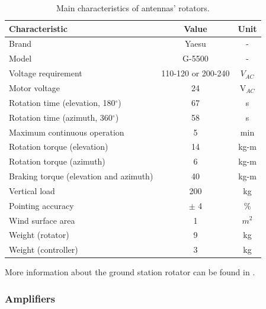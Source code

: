 \begin{table}[!ht]
    \centering
    \begin{tabular}{lcc}
        \toprule[1.5pt]
        \textbf{Characteristic}                     & \textbf{Value}        & \textbf{Unit} \\
        \midrule
        Brand                                       & Yaesu                 & - \\
        Model                                       & G-5500                & - \\
        Voltage requirement                         & 110-120 or 200-240    & $V_{AC}$ \\
        Motor voltage                               & 24                    & V$_{AC}$ \\
        Rotation time (elevation, 180$^{\circ}$)    & 67                    & s \\
        Rotation time (azimuth, 360$^{\circ}$)      & 58                    & s \\
        Maximum continuous operation                & 5                     & min \\
        Rotation torque (elevation)                 & 14                    & kg-m \\
        Rotation torque (azimuth)                   & 6                     & kg-m \\
        Braking torque (elevation and azimuth)      & 40                    & kg-m \\
        Vertical load                               & 200                   & kg \\
        Pointing accuracy                           & $\pm$ 4               & \% \\
        Wind surface area                           & 1                     & $m^{2}$ \\
        Weight (rotator)                            & 9                     & kg \\
        Weight (controller)                         & 3                     & kg \\
        \bottomrule[1.5pt]
    \end{tabular}
    \caption{Main characteristics of antennas' rotators.}
    \label{tab:grs-rotor}
\end{table}

More information about the ground station rotator can be found in \cite{g5500}.

\subsubsection{Amplifiers}


